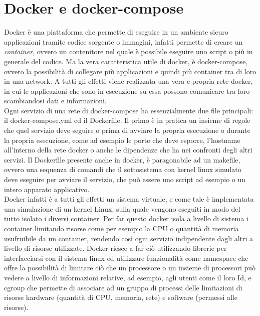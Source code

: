 \documentclass[a4paper,titlepage,12pt]{book}
\begin{document}
{\section{
Docker e docker-compose}
Docker è una piattaforma che permette di eseguire in un ambiente sicuro applicazioni tramite codice sorgente o immagini, infatti permette di creare un \textit{container}, ovvero un contenitore nel quale è possibile eseguire uno script o più in generale del codice. Ma la vera caratteristica utile di docker, è docker-compose, ovvero la possibilità di collegare più applicazioni e quindi più container tra di loro in una network. A tutti gli effetti viene realizzata una vera e propria rete docker, in cui le applicazioni che sono in esecuzione su essa possono comunicare tra loro scambiandosi dati e informazioni.\\
Ogni servizio di una rete di docker-compose ha essenzialmente due file principali: il docker-compose.yml ed il Dockerfile. Il primo è in pratica un insieme di regole che quel servizio deve seguire o prima di avviare la propria esecuzione o durante la propria esecuzione, come ad esempio le porte che deve esporre, l'hostname all'interno della rete docker o anche le dipendenze che ha nei confronti degli altri servizi. Il Dockerfile presente anche in docker, è paragonabile ad un makefile, ovvero una sequenza di comandi che il sottosistema con kernel linux simulato deve eseguire per avviare il servizio, che può essere uno script ad esempio o un intero apparato applicativo.\\
Docker infatti è a tutti gli effetti un sistema virtuale, e come tale è implementata una simulazione di un kernel Linux, sulla quale vengono eseguiti in modo del tutto isolato i diversi container.
Per far questo docker isola a livello di sistema i container limitando risorse come per esempio la CPU o quantità di memoria usufruibile da un container, rendendo così ogni servizio indipendente dagli altri a livello di risorse utilizzate. Docker riesce a far ciò utilizzando librerie per interfacciarsi con il sistema linux ed utilizzare funzionalità come namespace che offre la possibilità di limitare ciò che un processore o un insieme di processori può vedere a livello di informazioni relative, ad esempio, agli utenti come il loro Id, e cgroup che permette di associare ad un gruppo di processi delle limitazioni di risorse hardware (quantità di CPU, memoria, rete) e software (permessi alle risorse).


}
\end{document}
